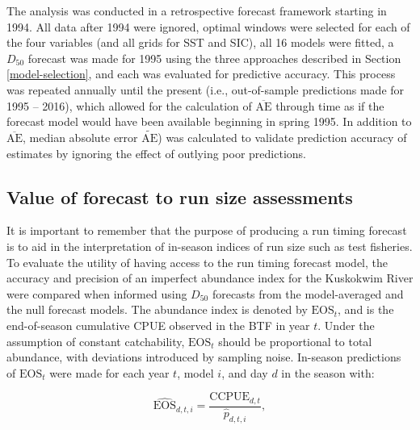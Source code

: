 \documentclass[12pt,]{book}
\theoremstyle{definition}
\theoremstyle{definition}
\theoremstyle{definition}
\theoremstyle{remark}
\begin{document}
\noindent
The analysis was conducted in a retrospective forecast framework
starting in 1994. All data after 1994 were ignored, optimal windows were
selected for each of the four variables (and all grids for SST and SIC),
all 16 models were fitted, a \(D_{50}\) forecast was made for 1995 using
the three approaches described in Section \ref{model-selection}, and
each was evaluated for predictive accuracy. This process was repeated
annually until the present (i.e., out-of-sample predictions made for
1995 -- 2016), which allowed for the calculation of
\(\overline{\text{AE}}\) through time as if the forecast model would
have been available beginning in spring 1995. In addition to
\(\overline{\text{AE}}\), median absolute error
\(\widetilde{\text{AE}}\)) was calculated to validate prediction
accuracy of estimates by ignoring the effect of outlying poor
predictions.

\subsection{Value of forecast to run size
assessments}\label{value-of-forecast-to-run-size-assessments}

\noindent
It is important to remember that the purpose of producing a run timing
forecast is to aid in the interpretation of in-season indices of run
size such as test fisheries. To evaluate the utility of having access to
the run timing forecast model, the accuracy and precision of an
imperfect abundance index for the Kuskokwim River were compared when
informed using \(D_{50}\) forecasts from the model-averaged and the null
forecast models. The abundance index is denoted by \(\text{EOS}_t\), and
is the end-of-season cumulative CPUE observed in the BTF in year \(t\).
Under the assumption of constant catchability, \(\text{EOS}_t\) should
be proportional to total abundance, with deviations introduced by
sampling noise. In-season predictions of \(\text{EOS}_t\) were made for
each year \(t\), model \(i\), and day \(d\) in the season with:

\begin{equation}
  \widehat{\text{EOS}}_{d,t,i}=\frac{\text{CCPUE}_{d,t}}{\hat{p}_{d,t,i}},
\label{eq:eos}
\end{equation}
\end{document}
